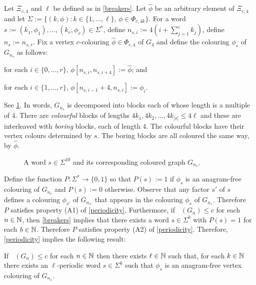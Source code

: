 \documentclass{patmorin}
\DeclareMathOperator{\afcn}{\dot{\chi}_\pi}
\begin{document}
Let $\Xi_{c,4}$ and $\ell$ be defined as in \cref{breakers}. Let $\hat{\phi}$ be an arbitrary element of $\Xi_{c,4}$ and let $\Sigma:=\{(k,\phi):k\in\{1,\ldots,\ell\},\, \phi\in\Phi_{c,4k}\}$. For a word $s:=(k_1,\phi_1),\ldots,(k_r,\phi_r)\in\Sigma^*$, define $n_{s,i}:=4(i+\sum_{j=1}^i k_j)$, define $n_s:=n_{s,r}$.  Fix a vertex $c$-colouring $\hat{\phi}\in \Phi_{c,4}$ of $G_4$ and define the colouring $\phi_s$ of $G_{n_s}$ as follows:
\begin{compactenum}
    \item for each $i\in\{0,\ldots,r\}$, $\phi[n_{s,i},n_{s,i+4}]:=\hat{\phi}$; and
    \item for each $i\in\{1,\ldots,r\}$, $\phi[n_{s,i-1}+4,n_{s,i}]:=\phi_i$.
\end{compactenum}
See \cref{bigexample}.  In words, $G_{n_s}$ is decomposed into blocks each of whose length is a multiple of $4$.  There are \emph{colourful} blocks of lengths $4k_1,4k_2,\ldots,4k_{|s|}\le 4\ell$ and these are interleaved with \emph{boring} blocks, each of length $4$.  The colourful blocks have their vertex colours determined by $s$. The boring blocks are all coloured the same way, by $\hat{\phi}$.

\begin{figure}
    \caption{A word $s\in\Sigma^{10}$ and its corresponding coloured graph $G_{n_s}$.}
    \label{bigexample}
\end{figure}


Define the function $P:\Sigma^*\to\{0,1\}$ so that $P(s):=1$ if $\phi_s$ is an anagram-free colouring of $G_{n_s}$ and $P(s):=0$ otherwise.  Observe that any factor $s'$ of $s$ defines a colouring $\phi_{s'}$ of $G_{n_{s'}}$ that appears in the colouring $\phi_s$ of $G_{n_s}$. Therefore $P$ satisfies property (A1) of \cref{periodicity}.  Furthermore, if $\afcn(G_n)\le c$ for each $n\in\mathbb{N}$, then \cref{breakers} implies that there exists a word $s\in\Sigma^{b}$ with $P(s)=1$ for each $b\in\mathbb{N}$.  Therefore $P$ satisfies property (A2) of \cref{periodicity}.  Therefore, \cref{periodicity} implies the following result:

\begin{lem}\label{block_colouring}
    If $\afcn(G_n)\le c$ for each $n\in\mathbb{N}$ then there exists $\ell\in\mathbb{N}$ such that, for each $k\in\mathbb{N}$ there exists an $\ell$-periodic word $s\in\Sigma^{k}$ such that $\phi_s$ is an anagram-free vertex colouring of $G_{n_s}$.
\end{lem}
\end{document}
